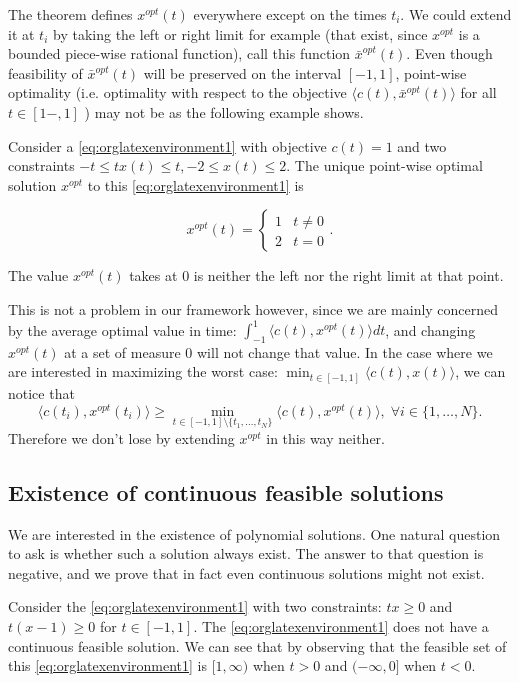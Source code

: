 \documentclass[moor]{informs1}
\begin{document}
The theorem defines \(x^{opt}(t)\) everywhere except on the times \(t_i\). We could extend it at \(t_i\) by taking the left or right limit for example (that exist, since \(x^{opt}\) is a bounded piece-wise rational function), call this function \(\bar x^{opt}(t)\). Even though feasibility of \(\bar x^{opt}(t)\) will be preserved on the interval \([-1, 1]\), point-wise optimality (i.e. optimality with respect to the objective \(\langle c(t), \bar x^{opt}(t) \rangle\) for all \(t \in [1-, 1]\) ) may not be as the following example shows.

\begin{myexample}
Consider a \ref{eq:orglatexenvironment1} with objective \(c(t) = 1\) and two constraints \(-t \le tx(t) \le t, -2 \le x(t) \le 2\).
The unique point-wise optimal solution \(x^{opt}\)  to this \ref{eq:orglatexenvironment1} is

\[x^{opt}(t) = \left\{\begin{array}{cc}1&t \ne 0\\2&t = 0\end{array}\right..\]

The value \(x^{opt}(t)\) takes at \(0\) is neither the left nor the right limit at that point.
\end{myexample}

This is not a problem in our framework however, since we are mainly concerned by the average optimal value in time: \(\int_{-1}^1 \langle c(t), x^{opt}(t) \rangle dt\), and changing \(x^{opt}(t)\) at a set of measure 0 will not change that value. In the case where we are interested in maximizing the worst case: \(\min_{t \in [-1, 1]} \langle c(t), x(t) \rangle\), we can notice that $$\langle c(t_i), x^{opt}(t_i)\rangle \ge \min_{t \in [-1, 1] \setminus \{t_1, \ldots, t_N\}} \langle c(t), x^{opt}(t) \rangle, \; \forall i \in \{1, \ldots, N\}.$$
Therefore we don't lose by extending \(x^{opt}\) in this way neither.
\newpage

\subsection{Existence of continuous feasible solutions}
\label{sec:orgheadline7}
We are interested in the existence of polynomial solutions. One natural question to ask is whether such a solution always exist. The answer to that question is negative, and we prove that in fact even continuous solutions might not exist.

\begin{myexample}
Consider the \ref{eq:orglatexenvironment1} with two constraints: \(tx \ge 0\) and \(t(x-1) \ge 0\) for \(t \in [-1, 1]\). The \ref{eq:orglatexenvironment1} does not have a continuous feasible solution. We can see that by observing that the feasible set of this \ref{eq:orglatexenvironment1}  is \([1, \infty)\) when \(t > 0\) and \((-\infty, 0]\) when \(t < 0\).
\end{myexample}
\end{document}
